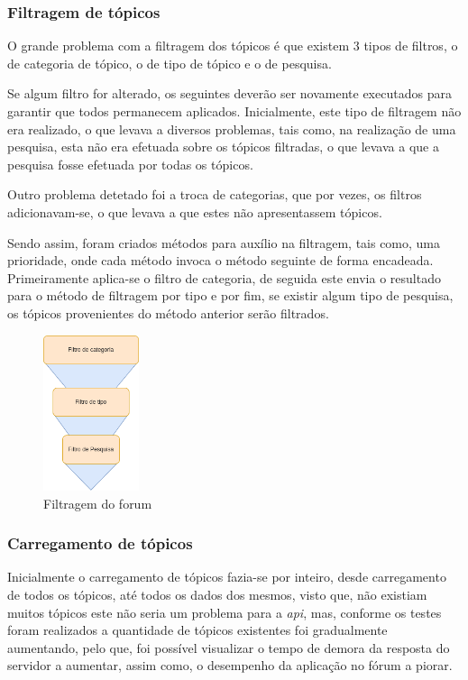 \subsubsection{Filtragem de tópicos}
O grande problema com a filtragem dos tópicos é que existem 3 tipos de filtros, o de categoria de tópico, o de tipo de tópico e o de pesquisa. 

Se algum filtro for alterado, os seguintes deverão ser novamente executados para garantir que todos permanecem aplicados. Inicialmente, este tipo de filtragem não era realizado, o que levava a diversos problemas, tais como, na realização de uma pesquisa, esta não era efetuada sobre os tópicos filtradas, o que levava a que a pesquisa fosse efetuada por todas os tópicos.

Outro problema detetado foi a troca de categorias, que por vezes, os filtros adicionavam-se, o que levava a que estes não apresentassem tópicos.

Sendo assim, foram criados métodos para auxílio na filtragem, tais como, uma prioridade, onde cada método invoca o método seguinte de forma encadeada. Primeiramente aplica-se o filtro de categoria, de seguida este envia o resultado para o método de filtragem por tipo e por fim, se existir algum tipo de pesquisa, os tópicos provenientes do método anterior serão filtrados.

\begin{figure}[htb]
 \centering
 \includegraphics[width=0.25\textwidth]{images/implementacao/frontend/forum/filtros/filtros.png}
 \caption{Filtragem do forum}
 \label{fig:73}
\end{figure}

\newpage

\subsubsection{Carregamento de tópicos}
Inicialmente o carregamento de tópicos fazia-se por inteiro, desde carregamento de todos os tópicos, até todos os dados dos mesmos, visto que, não existiam muitos tópicos este não seria um problema para a \textit{\acrshort{api}}, mas, conforme os testes foram realizados a quantidade de tópicos existentes foi gradualmente aumentando, pelo que, foi possível visualizar o tempo de demora da resposta do servidor a aumentar, assim como, o desempenho da aplicação no fórum a piorar.

